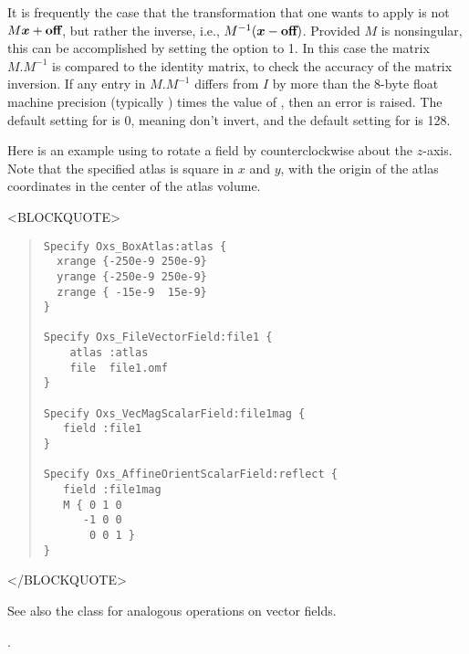 \begin{description}
It is frequently the case that the transformation that one wants to
apply is not $M\mbox{\boldmath$x$}+\textbf{off}$, but rather the
inverse, i.e., $M^{-1}(\mbox{\boldmath$x$}-\textbf{off})$.  Provided $M$
is nonsingular, this can be accomplished by setting the
 option to 1.  In this case the matrix $M.M^{-1}$ is
compared to the identity matrix, to check the accuracy of the matrix
inversion.  If any entry in $M.M^{-1}$ differs from $I$ by more than the
8-byte float machine precision (typically
) times the value of
, then an error is raised. The default setting
for  is 0, meaning don't invert,
and the default setting for  is 128.

Here is an example using  to rotate a
field by  counterclockwise about the
$z$-axis.  Note that the specified atlas is square in $x$ and $y$, with
the origin of the atlas coordinates in the center of the atlas volume.
\begin{rawhtml}
<BLOCKQUOTE>
\end{rawhtml}
\begin{quote}
\begin{verbatim}
Specify Oxs_BoxAtlas:atlas {
  xrange {-250e-9 250e-9}
  yrange {-250e-9 250e-9}
  zrange { -15e-9  15e-9}
}

Specify Oxs_FileVectorField:file1 {
    atlas :atlas
    file  file1.omf
}

Specify Oxs_VecMagScalarField:file1mag {
   field :file1
}

Specify Oxs_AffineOrientScalarField:reflect {
   field :file1mag
   M { 0 1 0
      -1 0 0
       0 0 1 }
}
\end{verbatim}
\end{quote}
\begin{rawhtml}
</BLOCKQUOTE>
\end{rawhtml}

See also the
class for
analogous operations on vector fields.

\begin{ExampleMifs}[Example]
  .
\end{ExampleMifs}


\end{description}
